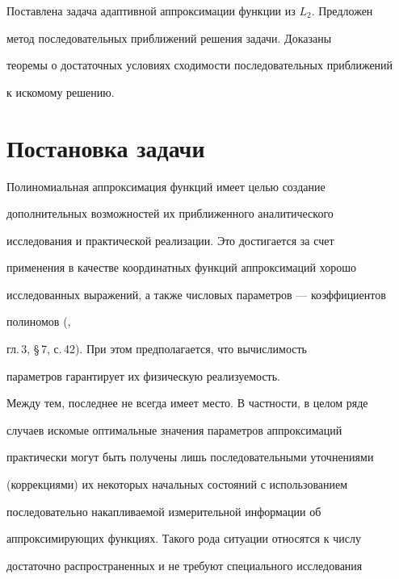 \label{begin} 


 


 


Поставлена задача адаптивной аппроксимации функции из $L_2$. Предложен 


метод последовательных приближений решения задачи. Доказаны 


теоремы о достаточных условиях сходимости последовательных приближений 


к искомому решению. 


 


\section{Постановка задачи} 


 


Полиномиальная аппроксимация функций имеет целью создание 


дополнительных возможностей их приближенного аналитического 


исследования и практической реализации. Это достигается за счет 


применения в качестве координатных функций аппроксимаций хорошо 


исследованных выражений, а также числовых параметров --- коэффициентов 


полиномов (\cite{1}, 


гл.\,3, \S\,7, с.\,42). При этом предполагается, что вычислимость 


параметров гарантирует их физическую реализуемость. 


 


Между тем, последнее не всегда имеет место. В частности, в целом ряде 


случаев искомые оптимальные значения параметров аппроксимаций 


практически могут быть получены лишь последовательными уточнениями 


(коррекциями) их некоторых начальных состояний с использованием 


последовательно накапливаемой измерительной информации об 


аппроксимирующих функциях. Такого рода ситуации относятся к числу 


достаточно распространенных и не требуют специального исследования 


